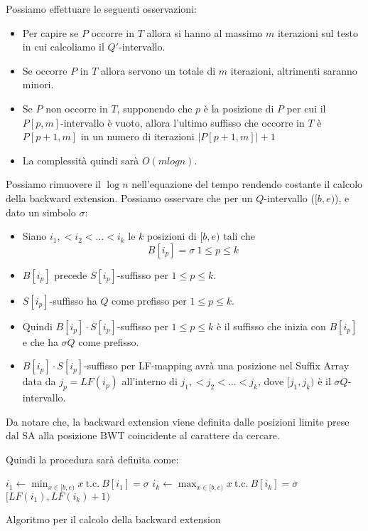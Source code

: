 Possiamo effettuare le seguenti osservazioni:
\begin{itemize}
    \item Per capire se $P$ occorre in $T$ allora si hanno al massimo $m$
          iterazioni sul testo in cui calcoliamo il $Q'$-intervallo.
    \item Se occorre $P$ in $T$ allora servono un totale di $m$ iterazioni,
          altrimenti saranno minori.
    \item Se $P$ non occorre in $T$, supponendo che $p$ è la posizione di $P$
          per cui il $P[p,m]$-intervallo è vuoto, allora l'ultimo suffisso che
          occorre in $T$ è $P[p+1,m]$ in un numero di iterazioni $|P[p+1,m]|+1$
    \item La complessità quindi sarà $O(mlogn)$.
\end{itemize}
Possiamo rimuovere il $\log n$ nell'equazione del tempo rendendo costante
il calcolo della backward extension. Possiamo osservare che per un $Q$-intervallo
($[b, e)$), e dato un simbolo $\sigma$:
\begin{itemize}
    \item Siano $i_1,<i_2<\dots<i_k$ le $k$ posizioni di $[b,e)$ tali che
          \begin{equation}
              B[i_p] = \sigma \ 1\le p \le k
          \end{equation}
    \item $B[i_p]$ precede $S[i_p]$-suffisso per $1\le p \le k$.
    \item $S[i_p]$-suffisso ha $Q$ come prefisso per $1\le p \le k$.
    \item Quindi  $B[i_p] \cdot S[i_p]$-suffisso per $1\le p \le k$ è il suffisso
          che inizia con $B[i_p]$ e che ha $\sigma Q$ come prefisso.
    \item $B[i_p] \cdot S[i_p]$-suffisso per LF-mapping avrà una posizione
          nel Suffix Array data da $j_p = LF(i_p)$ all'interno di  $j_1,<j_2<\dots<j_k$,
          dove $[j_1,j_k)$ è il $\sigma Q$-intervallo.
\end{itemize}
Da notare che, la backward extension viene definita dalle posizioni limite prese
dal SA alla posizione BWT coincidente al carattere da cercare.

Quindi la procedura sarà definita come:

\begin{algorithm}
    \begin{algorithmic}
        \State $i_1 \gets \min_{x\in [b,e)} x \ \text{t.c.} \ B[i_1]=\sigma$
        \State $i_k \gets \max_{x\in [b,e)} x \ \text{t.c.} \ B[i_k]=\sigma$
        \State \Return $[LF(i_1), LF(i_k)+1)$
        \EndFunction
    \end{algorithmic}
    \caption{Algoritmo per il calcolo della backward extension}
\end{algorithm}

